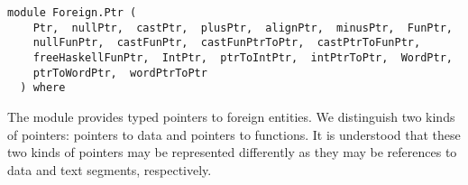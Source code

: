 \label{module:Foreign.Ptr}
\haddockbeginheader
{\haddockverb\begin{verbatim}
module Foreign.Ptr (
    Ptr,  nullPtr,  castPtr,  plusPtr,  alignPtr,  minusPtr,  FunPtr, 
    nullFunPtr,  castFunPtr,  castFunPtrToPtr,  castPtrToFunPtr, 
    freeHaskellFunPtr,  IntPtr,  ptrToIntPtr,  intPtrToPtr,  WordPtr, 
    ptrToWordPtr,  wordPtrToPtr
  ) where\end{verbatim}}
\haddockendheader

The module  provides typed pointers to foreign
 entities.  We distinguish two kinds of pointers: pointers to data
 and pointers to functions.  It is understood that these two kinds
 of pointers may be represented differently as they may be
 references to data and text segments, respectively.
\par

